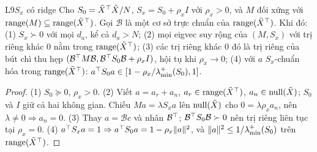 \begin{namedthm}{L9}{$S_x$ có ridge}
Cho $S_0=\tilde X^{\top}\tilde X/N$, $S_x=S_0+\rho_xI$ với $\rho_x>0$, và $M$ đối xứng với $\operatorname{range}(M)\subseteq\operatorname{range}(\tilde X^{\top})$. Gọi $\mathcal B$ là một cơ sở trực chuẩn của $\operatorname{range}(\tilde X^{\top})$. Khi đó:
(1) $S_x\succ0$ với mọi $d_a$, kể cả $d_a>N$;
(2) mọi eigvec suy rộng của $(M,S_x)$ với trị riêng khác $0$ nằm trong $\operatorname{range}(\tilde X^{\top})$;
(3) các trị riêng khác $0$ đó là trị riêng của bút chì thu hẹp $(\mathcal B^{\top} M\mathcal B,\mathcal B^{\top} S_0\mathcal B+\rho_xI)$, hội tụ khi $\rho_x\to0$;
(4) với $a$ $S_x$-chuẩn hóa trong $\operatorname{range}(\tilde X^{\top})$: $a^{\top} S_0a\in[1-\rho_x/\lambda^+_{\min}(S_0),1]$.
\end{namedthm}
\begin{proof}
(1) $S_0\succeq0$, $\rho_x>0$. (2) Viết $a=a_r+a_n$, $a_r\in\operatorname{range}(\tilde X^{\top})$, $a_n\in\operatorname{null}(\tilde X)$; $S_0$ và $I$ giữ cả hai không gian. Chiếu $Ma=\lambda S_xa$ lên $\operatorname{null}(\tilde X)$ cho $0=\lambda\rho_xa_n$, nên $\lambda\ne0\Rightarrow a_n=0$. (3) Thay $a=\mathcal Bc$ và nhân $\mathcal B^{\top}$; $\mathcal B^{\top} S_0\mathcal B\succ0$ nên trị riêng liên tục tại $\rho_x=0$. (4) $a^{\top} S_xa=1\Rightarrow a^{\top} S_0a=1-\rho_x\lVert a\rVert^2$, và $\lVert a\rVert^2\le1/\lambda^+_{\min}(S_0)$ trên $\operatorname{range}(\tilde X^{\top})$.
\end{proof}

